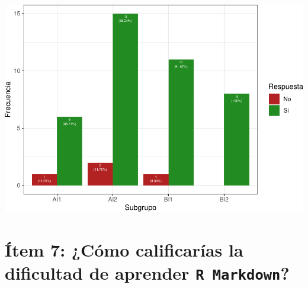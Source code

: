 \documentclass[
]{article}
\newenvironment{Shaded}{\begin{snugshade}}{\end{snugshade}}
\newcommand{\AttributeTok}[1]{\textcolor[rgb]{0.13,0.29,0.53}{#1}}
\newcommand{\FunctionTok}[1]{\textcolor[rgb]{0.13,0.29,0.53}{\textbf{#1}}}
\newcommand{\NormalTok}[1]{#1}
\newcommand{\OtherTok}[1]{\textcolor[rgb]{0.56,0.35,0.01}{#1}}
\newcommand{\SpecialCharTok}[1]{\textcolor[rgb]{0.81,0.36,0.00}{\textbf{#1}}}
\begin{document}
\includegraphics{informe_files/figure-latex/unnamed-chunk-7-1.pdf}

\hypertarget{uxedtem-7-cuxf3mo-calificaruxedas-la-dificultad-de-aprender}{%
\section{\texorpdfstring{Ítem 7: ¿Cómo calificarías la dificultad de
aprender
\texttt{R Markdown}?}{Ítem 7: ¿Cómo calificarías la dificultad de aprender ?}}\label{uxedtem-7-cuxf3mo-calificaruxedas-la-dificultad-de-aprender}}

\begin{Shaded}
\end{Shaded}
\end{document}
